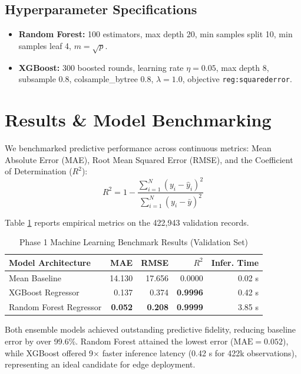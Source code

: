 \documentclass[conference]{IEEEtran}
\begin{document}
\subsection{Hyperparameter Specifications}
\begin{itemize}
    \item \textbf{Random Forest:} 100 estimators, max depth 20, min samples split 10, min samples leaf 4, $m = \sqrt{p}$.
    \item \textbf{XGBoost:} 300 boosted rounds, learning rate $\eta = 0.05$, max depth 8, subsample 0.8, colsample\_bytree 0.8, $\lambda = 1.0$, objective \texttt{reg:squarederror}.
\end{itemize}

\section{Results \& Model Benchmarking}
We benchmarked predictive performance across continuous metrics: Mean Absolute Error (MAE), Root Mean Squared Error (RMSE), and the Coefficient of Determination ($R^2$):
\begin{equation}
R^2 = 1 - \frac{\sum_{i=1}^N (y_i - \hat{y}_i)^2}{\sum_{i=1}^N (y_i - \bar{y})^2}
\end{equation}

Table \ref{tab:model_comparison} reports empirical metrics on the 422,943 validation records.

\begin{table}[htbp]
\caption{Phase 1 Machine Learning Benchmark Results (Validation Set)}
\label{tab:model_comparison}
\centering
\begin{tabular}{lrrrr}
\toprule
\textbf{Model Architecture} & \textbf{MAE} & \textbf{RMSE} & \textbf{$R^2$} & \textbf{Infer. Time} \\
\midrule
Mean Baseline & 14.130 & 17.656 & 0.0000 & 0.02 s \\
XGBoost Regressor & 0.137 & 0.374 & \textbf{0.9996} & 0.42 s \\
Random Forest Regressor & \textbf{0.052} & \textbf{0.208} & \textbf{0.9999} & 3.85 s \\
\bottomrule
\end{tabular}
\end{table}

Both ensemble models achieved outstanding predictive fidelity, reducing baseline error by over 99.6\%. Random Forest attained the lowest error ($\text{MAE} = 0.052$), while XGBoost offered 9$\times$ faster inference latency (0.42 s for 422k observations), representing an ideal candidate for edge deployment.
\end{document}
